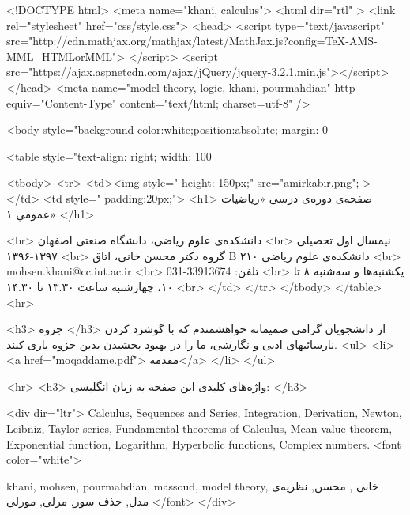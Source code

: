 <!DOCTYPE html>
<meta name="khani, calculus">	 
<html dir="rtl" >
<link rel="stylesheet" href="css/style.css">
<head>
 <script type="text/javascript"
     src="http://cdn.mathjax.org/mathjax/latest/MathJax.js?config=TeX-AMS-MML_HTMLorMML">
  </script>
<script src="https://ajax.aspnetcdn.com/ajax/jQuery/jquery-3.2.1.min.js"></script>
</head>
 <meta name="model theory, logic, khani, pourmahdian" http-equiv="Content-Type" content="text/html; charset=utf-8" />

<body style="background-color:white;position:absolute; margin: 0%

<table style="text-align: right;  width: 100%

<tbody>
    <tr>
      <td><img style=" height: 150px;" src="amirkabir.png"; >
      </td>
      <td  style=" padding:20px;">
<h1>
صفحه‌ی دوره‌ی درسی «ریاضیات عمومیِ ۱»
</h1>

<br>
دانشکده‌ی علوم ریاضی،‌ دانشگاه صنعتی اصفهان
<br>
 نیمسال اول تحصیلی ۱۳۹۷-۱۳۹۶
 <br>
 گروه دکتر محسن خانی، اتاق  B ۲۱۰ دانشکده‌ی علوم ریاضی
 <br>
mohsen.khani@cc.iut.ac.ir
 <br>
 تلفن: 33913674-031
 <br>
 یکشنبه‌ها و سه‌شنبه ۸ تا ۱۰، چهارشنبه ساعت ۱۳.۳۰ تا ۱۴.۳۰
<br>
</td>
 </tr>
      </tbody>
</table>
<hr>

	<h3>
جزوه
</h3>
از دانشجویان گرامی صمیمانه خواهشمندم که با گوشزد کردن نارسائیهای ادبی و نگارشی،  ما را در بهبود بخشیدن بدین جزوه یاری کنند.
<ul>
<li>
<a href="moqaddame.pdf"> مقدمه</a>
</li>
</ul>

<hr>
<h3>
واژه‌های کلیدی این صفحه به زبان انگلیسی:
</h3>

<div dir="ltr">
Calculus, Sequences and Series, Integration, Derivation, Newton, Leibniz, Taylor series,  Fundamental theorems of Calculus, Mean value theorem,
Exponential function, Logarithm, Hyperbolic functions, Complex numbers.
 <font color="white">
 
khani, mohsen, pourmahdian, massoud, model theory, خانی , محسن, نظریه‌ی مدل, حذف سور, مرلی, مورلی
</font>
</div>
